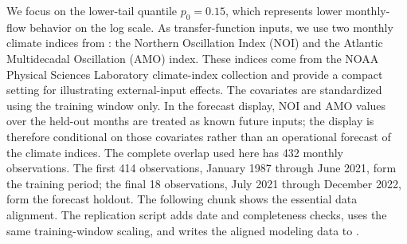 \documentclass{jss}
\begin{document}
We focus on the lower-tail quantile \(p_0=0.15\), which represents lower
monthly-flow behavior on the log scale. As transfer-function inputs, we use two
monthly climate indices from : the Northern Oscillation
Index (NOI) and the Atlantic Multidecadal Oscillation (AMO) index. These indices
come from the NOAA Physical Sciences Laboratory climate-index collection
\citep{noaaClimateIndices} and provide a compact setting for illustrating
external-input effects. The covariates are standardized using the training
window only. In the forecast display, NOI and AMO values over the held-out
months are treated as known future inputs; the display is therefore conditional
on those covariates rather than an operational forecast of the climate indices.
The complete overlap used here has 432 monthly observations. The first 414
observations, January 1987 through June 2021, form the training period; the final
18 observations, July 2021 through December 2022, form the forecast holdout. The
following chunk shows the essential data alignment. The replication script adds
date and completeness checks, uses the same training-window scaling, and writes
the aligned modeling data to
.

\begin{CodeChunk}
\end{CodeChunk}
\end{document}
